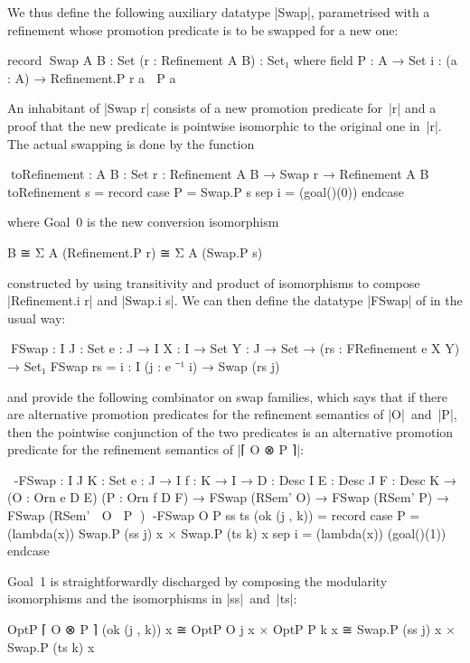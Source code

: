 We thus define the following auxiliary datatype |Swap|, parametrised with a refinement whose promotion predicate is to be swapped for a new one:
\begin{code}
record ^^^Swap {A B : Set} (r : Refinement A B) : Set₁ where
  field
    P  : A → Set
    i  : (a : A) → Refinement.P r a ≅ P a
\end{code}
An inhabitant of |Swap r| consists of a new promotion predicate for~|r| and a proof that the new predicate is pointwise isomorphic to the original one in~|r|.
The actual swapping is done by the function
\begin{code}
^^^toRefinement : {A B : Set} {r : Refinement A B} → Swap r → Refinement A B
toRefinement s = record  case  P  = Swap.P s
                         sep   i  = (goal()(0)) endcase
\end{code}
where Goal~0 is the new conversion isomorphism
\begin{code}
B ≅ Σ A (Refinement.P r) ≅ Σ A (Swap.P s)
\end{code}
constructed by using transitivity and product of isomorphisms to compose |Refinement.i r| and |Swap.i s|.
We can then define the datatype |FSwap| of  in the usual way:
\begin{code}
^^^FSwap :  {I J : Set} {e : J → I} {X : I → Set} {Y : J → Set} →
            (rs : FRefinement e X Y) → Set₁
FSwap rs = {i : I} (j : e ⁻¹ i) → Swap (rs j)
\end{code}
and provide the following combinator on swap families, which says that if there are alternative promotion predicates for the refinement semantics of |O|~and~|P|, then the pointwise conjunction of the two predicates is an alternative promotion predicate for the refinement semantics of |⌈ O ⊗ P ⌉|:
\begin{code}
^^^⊗-FSwap :  {I J K : Set} {e : J → I} {f : K → I} →
              {D : Desc I} {E : Desc J} {F : Desc K} →
              (O : Orn e D E) (P : Orn f D F) →
              FSwap (RSem' O) → FSwap (RSem' P) → FSwap (RSem' ⌈ O ⊗ P ⌉)
⊗-FSwap O P ss ts (ok (j , k)) = record
  case  P   = (lambda(x)) Swap.P (ss j) x × Swap.P (ts k) x
  sep   i   = (lambda(x)) (goal()(1)) endcase
\end{code}
Goal~1 is straightforwardly discharged by composing the modularity isomorphisms and the isomorphisms in |ss|~and~|ts|:
\begin{code}
OptP ⌈ O ⊗ P ⌉ (ok (j , k)) x  ≅ OptP O j x       × OptP P k x
                               ≅ Swap.P (ss j) x  × Swap.P (ts k) x
\end{code}

